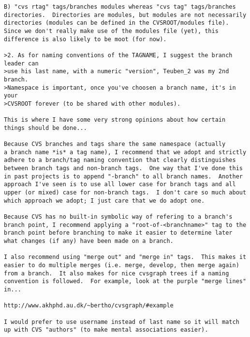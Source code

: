\documentclass{article}
\begin{document}
\begin{enumerate}
\begin{verbatim}
B) "cvs rtag" tags/branches modules whereas "cvs tag" tags/branches
directories.  Directories are modules, but modules are not necessarily
directories (modules can be defined in the CVSROOT/modules file).
Since we don't really make use of the modules file (yet), this
difference is also likely to be moot (for now).

>2. As for naming conventions of the TAGNAME, I suggest the branch leader can
>use his last name, with a numeric "version", Teuben_2 was my 2nd branch.
>Namespace is important, once you've choosen a branch name, it's in your
>CVSROOT forever (to be shared with other modules).

This is where I have some very strong opinions about how certain
things should be done...
                                                                                
Because CVS branches and tags share the same namespace (actually
a branch name *is* a tag name), I recommend that we adopt and strictly
adhere to a branch/tag naming convention that clearly distinguishes
between branch tags and non-branch tags.  One way that I've done this
in past projects is to append "-branch" to all branch names.  Another
approach I've seen is to use all lower case for branch tags and all
upper (or mixed) case for non-branch tags.  I don't care so much about
which approach we adopt; I just care that we do adopt one.
                                                                                
Because CVS has no built-in symbolic way of refering to a branch's
branch point, I recommend applying a "root-of-<branchname>" tag to the
branch point before branching to make it easier to determine later
what changes (if any) have been made on a branch.
                                                                                
I also recommend using "merge out" and "merge in" tags.  This makes it
easier to do multiple merges (i.e. merge, develop, then merge again)
from a branch.  It also makes for nice cvsgraph trees if a naming
convention is followed.  For example, look at the purple "merge lines"
in...
                                                                                
http://www.akhphd.au.dk/~bertho/cvsgraph/#example
                                                                                
I would prefer to use username instead of last name so it will match
up with CVS "authors" (to make mental associations easier).
                                                                                

\end{verbatim}
\end{enumerate}
\end{document}
